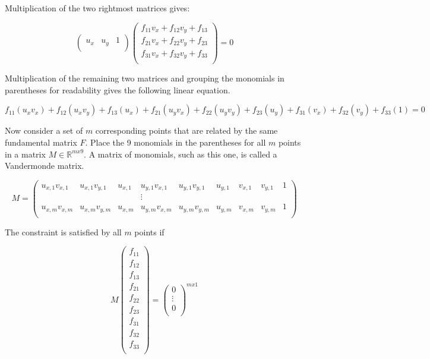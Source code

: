 Multiplication of the two rightmost matrices gives:

\[
\begin{pmatrix}
u_x & u_y & 1 \\
\end{pmatrix}
\begin{pmatrix}
f_{11} v_x + f_{12} v_y + f_{13} \\
f_{21} v_x + f_{22} v_y + f_{23} \\
f_{31} v_x + f_{32} v_y + f_{33} \\
\end{pmatrix}
= 0
\]

Multiplication of the remaining two matrices and grouping the monomials in parentheses for readability gives the following linear equation.

\[
f_{11} (u_x v_x) + f_{12} (u_x v_y) + f_{13} (u_x) +
f_{21} (u_y v_x) + f_{22} (u_y v_y) + f_{23} (u_y) +
f_{31} (v_x) + f_{32} (v_y) + f_{33} (1)
= 0
\]

Now consider a set of $m$ corresponding points that are related by the same fundamental matrix $F$. Place the 9 monomials in the parentheses for all $m$ points in a matrix $ M \in \mathbb{R}^{mx9} $. A matrix of monomials, such as this one, is called a Vandermonde matrix.

\[
M=
\begin{pmatrix}
u_{x,1} v_{x,1} & u_{x,1} v_{y,1} & u_{x,1} & u_{y,1} v_{x,1} & u_{y,1} v_{y,1} & u_{y,1} & v_{x,1} & v_{y,1} & 1 \\
 & & & \vdots & & & & & \\
u_{x,m} v_{x,m} & u_{x,m} v_{y,m} & u_{x,m} & u_{y,m} v_{x,m} & u_{y,m} v_{y,m} & u_{y,m} & v_{x,m} & v_{y,m} & 1 \\
\end{pmatrix}
\]

The constraint is satisfied by all $m$ points if

\[
M
\begin{pmatrix}
f_{11} \\
f_{12} \\
f_{13} \\
f_{21} \\
f_{22} \\
f_{23} \\
f_{31} \\
f_{32} \\
f_{33} \\
\end{pmatrix}
=
\begin{pmatrix}
0 \\
\vdots \\
0 \\
\end{pmatrix}
^{mx1}
\]

